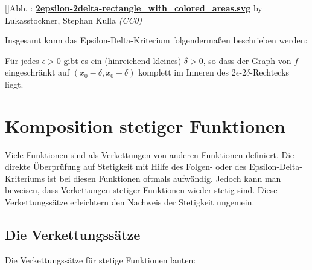 \documentclass[fontsize=9pt,
               parskip=half-,
               DIV=14,
               listof=chapterentry,
               tocflat]{scrbook}
\newcounter{imagelabel}
\begin{document}
[]{Abb. : \protect\href{https://commons.wikimedia.org/wiki/File:2epsilon-2delta-rectangle_with_colored_areas.svg}{\textbf{2epsilon\allowbreak-2delta\allowbreak-rectangle\allowbreak\_with\allowbreak\_colored\allowbreak\_areas.svg}} by Lukasstockner, Stephan Kulla \textit{(CC0)}}\begin{center}
\end{center}

Insgesamt kann das Epsilon-Delta-Kriterium folgendermaßen beschrieben werden:

\begin{importantparagraph*}
Für jedes $\epsilon >0$ gibt es ein (hinreichend kleines) $\delta >0$, so dass der Graph von $f$ eingeschränkt auf $(x_{0}-\delta ,x_{0}+\delta )$ komplett im Inneren des $2\epsilon $-$2\delta $-Rechtecks liegt.

\end{importantparagraph*}

\chapter{Komposition stetiger Funktionen}

Viele Funktionen sind als Verkettungen von anderen Funktionen definiert. Die direkte Überprüfung auf Stetigkeit mit Hilfe des Folgen- oder des Epsilon-Delta-Kriteriums ist bei diesen Funktionen oftmals aufwändig. Jedoch kann man beweisen, dass Verkettungen stetiger Funktionen wieder stetig sind. Diese Verkettungssätze erleichtern den Nachweis der Stetigkeit ungemein.

\section{Die Verkettungssätze}

Die Verkettungssätze für stetige Funktionen lauten:
\end{document}
